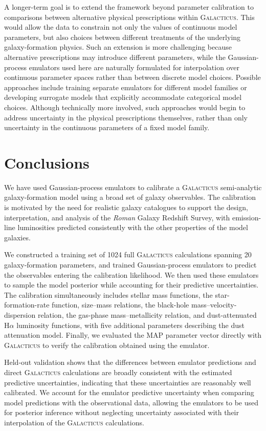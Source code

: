 \documentclass[twocolumn, apj, numberedappendix, iop]{openjournal}
\newcommand{\galacticus}{\textsc{Galacticus}\xspace}
\newcommand{\romanspace}{\textit{Roman}\xspace}
\newcommand{\ha}{H$\alpha$}
\begin{document}
A longer-term goal is to extend the framework beyond parameter calibration to
comparisons between alternative physical prescriptions within \galacticus{}.
This would allow the data to constrain not only the values of continuous model
parameters, but also choices between different treatments of the underlying
galaxy-formation physics. Such an extension is more challenging because alternative prescriptions may introduce different parameters, while the Gaussian-process emulators used here are naturally formulated for interpolation over continuous parameter spaces rather than between discrete model choices. Possible approaches include
training separate emulators for different model families or developing
surrogate models that explicitly accommodate categorical model choices.
Although technically more involved, such approaches would begin to address
uncertainty in the physical prescriptions themselves, rather than only
uncertainty in the continuous parameters of a fixed model family.

\section{Conclusions}
\label{sec:conclusions}

We have used Gaussian-process emulators to calibrate a \galacticus{}
semi-analytic galaxy-formation model using a broad set of galaxy observables.
The calibration is motivated by the need for realistic galaxy catalogues to
support the design, interpretation, and analysis of the \romanspace{} Galaxy
Redshift Survey, with emission-line luminosities predicted consistently with
the other properties of the model galaxies.

We constructed a training set of 1024 full \galacticus{} calculations spanning
20 galaxy-formation parameters, and trained Gaussian-process emulators to
predict the observables entering the calibration likelihood. We then used
these emulators to sample the model posterior while accounting for their
predictive uncertainties. The calibration simultaneously includes stellar
mass functions, the star-formation-rate function, size--mass relations, the
black-hole mass--velocity-dispersion relation, the gas-phase mass--metallicity
relation, and dust-attenuated \ha{} luminosity functions, with five additional
parameters describing the dust attenuation model. Finally, we evaluated the
MAP parameter vector directly with \galacticus{} to verify the calibration
obtained using the emulator.

Held-out validation shows that the differences between emulator predictions
and direct \galacticus{} calculations are broadly consistent with the
estimated predictive uncertainties, indicating that these uncertainties are
reasonably well calibrated. We account for the emulator predictive uncertainty
when comparing model predictions with the observational data, allowing the
emulators to be used for posterior inference without neglecting uncertainty
associated with their interpolation of the \galacticus{} calculations.
\end{document}
